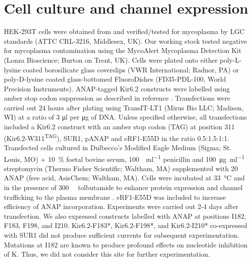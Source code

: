 \section{Cell culture and channel expression}
HEK-293T cells were obtained from and verified/tested for mycoplasma by LGC standards (ATTC CRL-3216, Middlesex, UK).
Our working stock tested negative for mycoplasma contamination using the MycoAlert Mycoplasma Detection Kit (Lonza Bioscience; Burton on Trent, UK).
Cells were plated onto either poly-L-lysine coated borosilicate glass coverslips (VWR International; Radnor, PA) or poly-D-lysine coated glass-bottomed FluoroDishes (FD35-PDL-100, World Precision Instruments).
ANAP-tagged Kir6.2 constructs were labelled using amber stop codon suppression as described in reference \cite{chatterjee_genetically_2013}.
Transfections were carried out 24 hours after plating using TransIT-LT1 (Mirus Bio LLC; Madison, WI) at a ratio of 3 \si{\micro\litre} per \si{\micro\gram} of DNA.
Unless specified otherwise, all transfections included a Kir6.2 construct with an amber stop codon (TAG) at position 311 (Kir6.2-W311\textsuperscript{TAG}), SUR1, pANAP and eRF1-E55D in the ratio 0.5:1.5:1:1.
Transfected cells cultured in Dulbecco’s Modified Eagle Medium (Sigma; St. Louis, MO) + \SI{10}{\percent} foetal bovine serum, \SI{100}{\Unit\per\milli\litre} penicillin and \SI{100}{\micro\gram\per\milli\litre} streptomycin (Thermo Fisher Scientific; Waltham, MA) supplemented with \SI{20}{\milli\Molar} ANAP (free acid, AsisChem; Waltham, MA).
Cells were incubated at \SI{33}{\degreeCelsius} and in the presence of \SI{300}{\micro\Molar} tolbutamide to enhance protein expression and channel trafficking to the plasma membrane \cite{yan_sulfonylureas_2004, martin_pharmacological_2013}.
eRF1-E55D was included to increase efficiency of ANAP incorporation.
Experiments were carried out 2-4 days after transfection.
We also expressed constructs labelled with ANAP at positions I182, F183, F198, and I210.
Kir6.2-F183*, Kir6.2-F198*, and Kir6.2-I210* co-expressed with SUR1 did not produce sufficient currents for subsequent experimentation.
Mutations at I182 are known to produce profound effects on nucleotide inhibition of K\ATP{}.
Thus, we did not consider this site for further experimentation.

